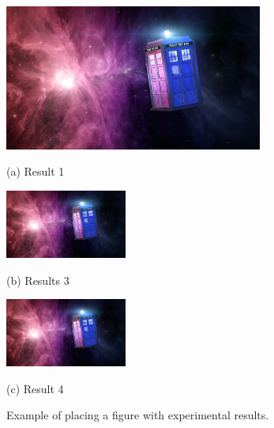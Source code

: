 \documentclass{article}
\begin{document}
\begin{figure}[htb]

\begin{minipage}[b]{1.0\linewidth}
  \centering
  \centerline{\includegraphics[width=8.5cm]{image1}}
  \centerline{(a) Result 1}\medskip
\end{minipage}
%
\begin{minipage}[b]{.48\linewidth}
  \centering
  \centerline{\includegraphics[width=4.0cm]{image1}}
  \centerline{(b) Results 3}\medskip
\end{minipage}
\hfill
\begin{minipage}[b]{0.48\linewidth}
  \centering
  \centerline{\includegraphics[width=4.0cm]{image1}}
  \centerline{(c) Result 4}\medskip
\end{minipage}
%
\caption{Example of placing a figure with experimental results.}
\label{fig:res}
%
\end{figure}





\end{document}
